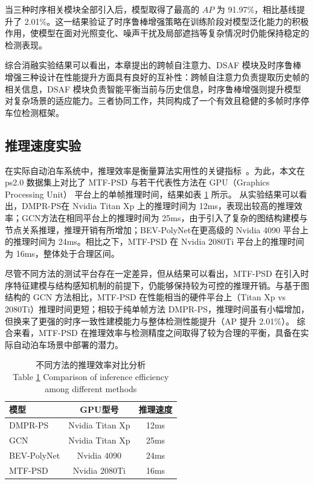 当三种时序相关模块全部引入后，模型取得了最高的 $AP$ 为 91.97\%，相比基线提升了 2.01\%。这一结果验证了时序鲁棒增强策略在训练阶段对模型泛化能力的积极作用，使模型在面对光照变化、噪声干扰及局部遮挡等复杂情况时仍能保持稳定的检测表现。

综合消融实验结果可以看出，本章提出的跨帧自注意力、DSAF 模块及时序鲁棒增强三种设计在性能提升方面具有良好的互补性：跨帧自注意力负责提取历史帧的相关信息，DSAF 模块负责智能平衡当前与历史信息，时序鲁棒增强则提升模型对复杂场景的适应能力。三者协同工作，共同构成了一个有效且稳健的多帧时序停车位检测框架。



\subsection{推理速度实验}

在实际自动泊车系统中，推理效率是衡量算法实用性的关键指标~\cite{wei2025real}。为此，本文在 ps2.0 数据集上对比了 MTF-PSD 与若干代表性方法在 GPU（Graphics Processing Unit） 平台上的单帧推理时间，结果如表 \ref{tab_infer} 所示。
从实验结果可以看出，DMPR-PS\cite{huang2019dmpr}在 Nvidia Titan Xp 上的推理时间为 12ms，表现出较高的推理效率；GCN\cite{min2021attentional}方法在相同平台上的推理时间为 25ms，由于引入了复杂的图结构建模与节点关系推理，推理开销有所增加；BEV-PolyNet\cite{duan2025bev}在更高级的 Nvidia 4090 平台上的推理时间为 24ms。相比之下，MTF-PSD 在 Nvidia 2080Ti 平台上的推理时间为 16ms，整体处于合理区间。

尽管不同方法的测试平台存在一定差异，但从结果可以看出，MTF-PSD 在引入时序特征建模与结构感知机制的前提下，仍能够保持较为可控的推理开销。与基于图结构的 GCN 方法相比，MTF-PSD 在性能相当的硬件平台上（Titan Xp vs 2080Ti）推理时间更短；相较于纯单帧方法 DMPR-PS，推理时间虽有小幅增加，但换来了更强的时序一致性建模能力与整体检测性能提升（AP 提升 2.01\%）。
综合来看，MTF-PSD 在推理效率与检测精度之间取得了较为合理的平衡，具备在实际自动泊车场景中部署的潜力。

\begin{table}[!h]
\centering
\setlength{\tabcolsep}{10mm}
\caption{不同方法的推理效率对比分析 \\ Table \ref{tab_infer} Comparison of inference efficiency among different methods}
\begin{tabular}{lcc}
\toprule
   模型 & GPU型号 & 推理速度 \\
\midrule
    DMPR-PS\cite{huang2019dmpr} & Nvidia Titan Xp & 12ms \\
    GCN\cite{min2021attentional} & Nvidia Titan Xp & 25ms \\
    BEV-PolyNet\cite{duan2025bev} & Nvidia 4090 & 24ms \\
    MTF-PSD  & Nvidia 2080Ti & 16ms \\
\bottomrule
\end{tabular}
\label{tab_infer}
\end{table}




